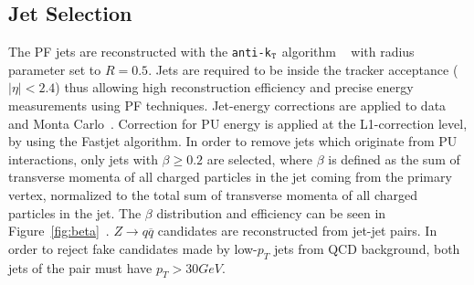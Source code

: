 \subsection{Jet Selection}
\label{sec:jetsel}
The PF jets are reconstructed with the {\tt anti-k$_{\tt T}$} algorithm ~\cite{antikt} with radius parameter set to $R=0.5$. Jets are required to be inside the tracker acceptance ($|\eta|<2.4$) thus allowing high reconstruction efficiency and precise energy measurements using PF techniques. Jet-energy corrections are applied to data and Monta Carlo~\cite{CMS-PAS-JME-10-010}. Correction for PU energy is applied at the L1-correction level, by using the Fastjet algorithm. In order to remove jets which originate from PU interactions, only jets with $\beta \ge 0.2$ are selected, where $\beta$ is defined as the sum of transverse momenta of all charged particles in the jet coming from the primary vertex, normalized to the total sum of transverse momenta of all charged particles in the jet. The $\beta$ distribution and efficiency can be seen in Figure~\ref{fig:beta}~\cite{2l2q115}. $Z \rightarrow q\overline{q} $ candidates are reconstructed from jet-jet pairs. In order to reject fake candidates made by low-$p_T$ jets from QCD background, both jets of the pair must have $p_T > 30 GeV$.


